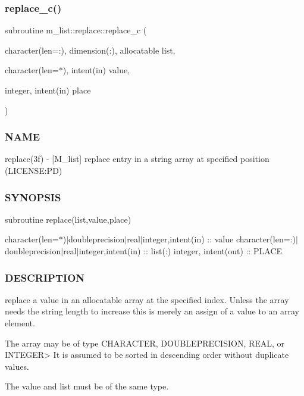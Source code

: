 \subsubsection{\texorpdfstring{replace\+\_\+c()}{replace\_c()}}
{\footnotesize\ttfamily subroutine m\+\_\+list\+::replace\+::replace\+\_\+c (\begin{DoxyParamCaption}\item[{character(len=\+:), dimension(\+:), allocatable}]{list,  }\item[{character(len=$\ast$), intent(in)}]{value,  }\item[{integer, intent(in)}]{place }\end{DoxyParamCaption})\hspace{0.3cm}{\ttfamily [private]}}



\subsubsection*{N\+A\+ME}

replace(3f) -\/ \mbox{[}M\+\_\+list\mbox{]} replace entry in a string array at specified position (L\+I\+C\+E\+N\+SE\+:PD) 

\subsubsection*{S\+Y\+N\+O\+P\+S\+IS}

subroutine replace(list,value,place)

character(len=$\ast$)$\vert$doubleprecision$\vert$real$\vert$integer,intent(in) \+:\+: value character(len=\+:)$\vert$doubleprecision$\vert$real$\vert$integer,intent(in) \+:\+: list(\+:) integer, intent(out) \+:\+: P\+L\+A\+CE

\subsubsection*{D\+E\+S\+C\+R\+I\+P\+T\+I\+ON}

\begin{DoxyVerb}replace a value in an allocatable array at the specified index. Unless the
array needs the string length to increase this is merely an assign of a value
to an array element.

The array may be of type CHARACTER, DOUBLEPRECISION, REAL, or INTEGER>
It is assumed to be sorted in descending order without duplicate values.

The value and list must be of the same type.
\end{DoxyVerb}


